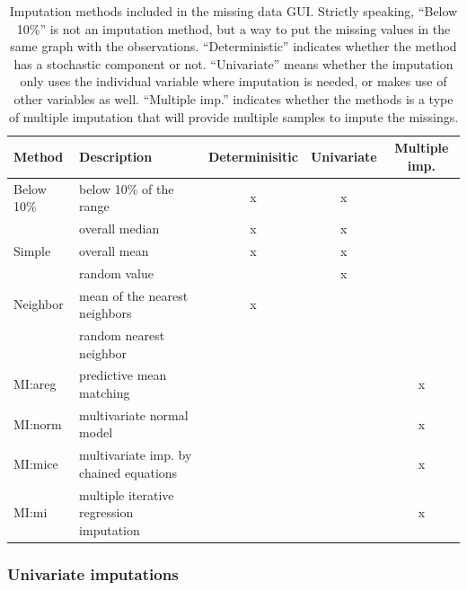 \documentclass[article]{jss}
\begin{document}
\begin{center}
\begin{table}[h]
\begin{centering}
\begin{tabular}{l|l|c|c|c}
\hline 
\textbf{\scriptsize{Method}} & \textbf{\scriptsize{Description}} & \textbf{\scriptsize{Determinisitic}} & \textbf{\scriptsize{Univariate}} & \textbf{\scriptsize{Multiple imp.}}\tabularnewline
\hline 
{\scriptsize{Below 10\%}} & {\scriptsize{below 10\% of the range}} & {\scriptsize{x}} & {\scriptsize{x}} & \tabularnewline
\hline 
 & {\scriptsize{overall median}} & {\scriptsize{x}} & {\scriptsize{x}} & \tabularnewline
{\scriptsize{Simple}} & {\scriptsize{overall mean}} & {\scriptsize{x}} & {\scriptsize{x}} & \tabularnewline 
 & {\scriptsize{random value}} &  & {\scriptsize{x}} & \tabularnewline
\hline
{\scriptsize{Neighbor}} & {\scriptsize{mean of the nearest neighbors}} & {\scriptsize{x}} &  & \tabularnewline
 & {\scriptsize{random nearest neighbor}} &  &  & \tabularnewline
\hline 
{\scriptsize{MI:areg}} & {\scriptsize{predictive mean matching}} &  &  & {\scriptsize{x}}\tabularnewline
\hline 
{\scriptsize{MI:norm}} & {\scriptsize{multivariate normal model}} &  &  & {\scriptsize{x}}\tabularnewline
\hline 
{\scriptsize{MI:mice}} & {\scriptsize{multivariate imp. by chained equations}} &  &  & {\scriptsize{x}}\tabularnewline
\hline 
{\scriptsize{MI:mi}} & {\scriptsize{multiple iterative regression imputation}} &  &  & {\scriptsize{x}}\tabularnewline
\hline 
\end{tabular}
\par\end{centering}
\caption{Imputation methods included in the missing data GUI.
Strictly speaking, ``Below 10\%'' is not an imputation method,
but a way to put the missing values in the same graph with the
observations. ``Deterministic'' indicates whether the method
has a stochastic component or not. ``Univariate'' means whether
the imputation only uses the individual variable where imputation
is needed, or makes use of other variables as well. ``Multiple
imp.'' indicates whether the methods is a type of multiple imputation
that will provide multiple samples to impute the missings.}
\label{tab:compare-methods}
\end{table}
\par\end{center}


\subsubsection{Univariate imputations}
\end{document}
